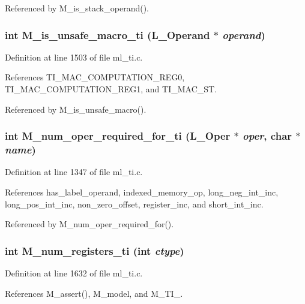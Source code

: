 Referenced by M\_\-is\_\-stack\_\-operand().
\subsubsection{\setlength{\rightskip}{0pt plus 5cm}int M\_\-is\_\-unsafe\_\-macro\_\-ti (L\_\-Operand $\ast$ {\em operand})}\label{m__ti_8h_cde805290046ff9cf301676d1135f0f0}




Definition at line 1503 of file ml\_\-ti.c.

References TI\_\-MAC\_\-COMPUTATION\_\-REG0, TI\_\-MAC\_\-COMPUTATION\_\-REG1, and TI\_\-MAC\_\-ST.

Referenced by M\_\-is\_\-unsafe\_\-macro().
\subsubsection{\setlength{\rightskip}{0pt plus 5cm}int M\_\-num\_\-oper\_\-required\_\-for\_\-ti (L\_\-Oper $\ast$ {\em oper}, char $\ast$ {\em name})}\label{m__ti_8h_4a5fa948fab23585d5b9dc74e4e4d5e3}




Definition at line 1347 of file ml\_\-ti.c.

References has\_\-label\_\-operand, indexed\_\-memory\_\-op, long\_\-neg\_\-int\_\-inc, long\_\-pos\_\-int\_\-inc, non\_\-zero\_\-offset, register\_\-inc, and short\_\-int\_\-inc.

Referenced by M\_\-num\_\-oper\_\-required\_\-for().
\subsubsection{\setlength{\rightskip}{0pt plus 5cm}int M\_\-num\_\-registers\_\-ti (int {\em ctype})}\label{m__ti_8h_c1ac51ff34bc864794d49f033c8efcd3}




Definition at line 1632 of file ml\_\-ti.c.

References M\_\-assert(), M\_\-model, and M\_\-TI\_.

